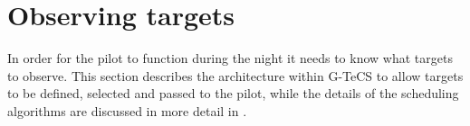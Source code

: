 \section{Observing targets}
\label{sec:observing}


\begin{colsection}

In order for the pilot to function during the night it needs to know what targets to observe. This section describes the architecture within G-TeCS to allow targets to be defined, selected and passed to the pilot, while the details of the scheduling algorithms are discussed in more detail in .

\end{colsection}


